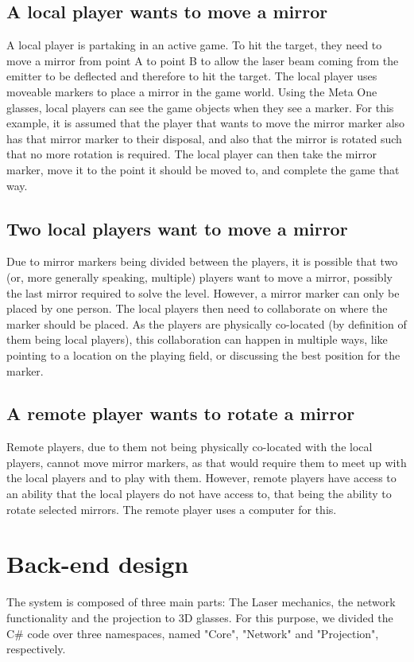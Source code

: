		\subsection{A local player wants to move a mirror} \label{ssec:localmovemirror}
			A local player is partaking in an active game. To hit the target, they
			need to move a mirror from point A to point B to allow the laser beam
			coming from the emitter to be deflected and therefore to hit the target.
			The local player uses moveable markers to place a mirror in the game
			world. Using the Meta One glasses, local players can see the game objects
			when they see a marker. For this example, it is assumed that the player that wants
			to move the mirror marker also has that mirror marker to their disposal,
			and also that the mirror is rotated such that no more rotation is required.
			The local player can then take the mirror marker, move it to the point
			it should be moved to, and complete the game that way.
			
		\subsection{Two local players want to move a mirror} \label{ssec:localmovemirrorcollab}
			Due to mirror markers being divided between the players, it is possible
			that two (or, more generally speaking, multiple) players want to move
			a mirror, possibly the last mirror required to solve the level. However,
			a mirror marker can only be placed by one person. The local players then
			need to collaborate on where the marker should be placed. As the players
			are physically co-located (by definition of them being local players),
			this collaboration can happen in multiple ways, like pointing to a 
			location on the playing field, or discussing the best position for the
			marker.
			
		\subsection{A remote player wants to rotate a mirror}
			Remote players, due to them not being physically co-located with the
			local players, cannot move mirror markers, as that would require them
			to meet up with the local players and to play with them. However, 
			remote players have access to an ability that the local players do
			not have access to, that being the ability to rotate selected mirrors.
			The remote player uses a computer for this. 

	\section{Back-end design} \label{sec:backenddesign}
		The system is composed of three main parts: The Laser mechanics, the network
		functionality and the projection to 3D glasses. For this purpose, we divided
		the C\# code over three namespaces, named "Core", "Network" and
		"Projection", respectively.


